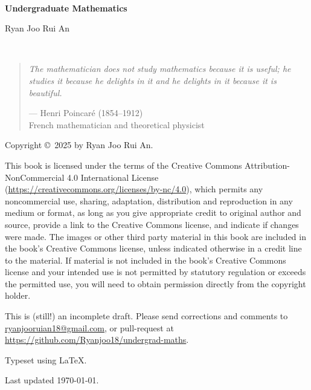 \begin{center}
\

\vspace{6cm}

{\huge\bfseries Undergraduate Mathematics}

\vspace{2cm}

{\huge Ryan Joo Rui An}
\end{center}
\thispagestyle{empty}
\pagebreak

\thispagestyle{empty}
\

\vfill

\begin{quote}
\textit{The mathematician does not study mathematics because it is useful; he studies it because he delights in it and he delights in it because it is beautiful.}

\begin{flushright}--- Henri Poincar\'{e} (1854--1912)\\
French mathematician and theoretical physicist\end{flushright}
\end{quote}

\vfill

Copyright \copyright \ 2025 by Ryan Joo Rui An.

This book is licensed under the terms of the Creative Commons Attribution-NonCommercial 4.0 International License (\url{https://creativecommons.org/licenses/by-nc/4.0}), which permits any noncommercial use, sharing, adaptation, distribution and reproduction in any medium or format, as long as you give appropriate credit to original author and source, provide a link to the Creative Commons license, and indicate if changes were made. The images or other third party material in this book are included in the book's Creative Commons license, unless indicated otherwise in a credit line to the material. If material is not included in the book's Creative Commons license and your intended use is not permitted by statutory regulation or exceeds the permitted use, you will need to obtain permission directly from the copyright holder.

This is (still!) an incomplete draft. Please send corrections and comments to \url{ryanjooruian18@gmail.com}, or pull-request at \url{https://github.com/Ryanjoo18/undergrad-maths}.

Typeset using \LaTeX.

Last updated \today.
\pagebreak

